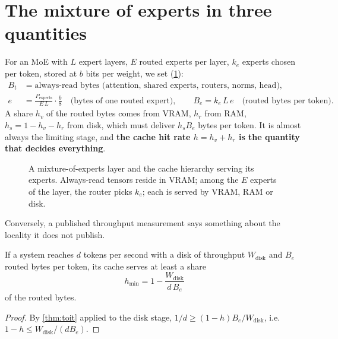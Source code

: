 \section{The mixture of experts in three quantities}\label{sec:moe-grandeurs}

For an MoE with $L$ expert layers, $E$ routed experts per layer, $k_e$ experts chosen per token, stored at $b$ bits per weight, we set (\cref{fig:moe}):
\begin{align}
B_t &= \text{always-read bytes (attention, shared experts, routers, norms, head)}, \nonumber\\
e &= \frac{P_{\text{experts}}}{E\, L} \cdot \frac{b}{8} \quad \text{(bytes of one routed expert)}, \qquad
B_e = k_e\, L\, e \quad \text{(routed bytes per token)}. \label{eq:moe-grandeurs}
\end{align}
A share $h_v$ of the routed bytes comes from VRAM, $h_r$ from RAM, $h_s = 1 - h_v - h_r$ from disk, which must deliver $h_s B_e$ bytes per token. It is almost always the limiting stage, and \textbf{the cache hit rate $h = h_v + h_r$ is the quantity that decides everything}.

\begin{figure}[ht]
\centering
\SchemaMoE
\caption[A mixture-of-experts layer and its cache hierarchy]{A mixture-of-experts layer and the cache hierarchy serving its experts. Always-read tensors reside in VRAM; among the $E$ experts of the layer, the router picks $k_e$; each is served by VRAM, RAM or disk.}
\label{fig:moe}
\end{figure}

Conversely, a published throughput measurement says something about the locality it does not publish.

\begin{lemme}\label{lem:succes-implique}
If a system reaches $d$ tokens per second with a disk of throughput $W_{\mathrm{disk}}$ and $B_e$ routed bytes per token, its cache serves at least a share
\begin{equation}\label{eq:succes-implique}
h_{\min} = 1 - \frac{W_{\mathrm{disk}}}{d\, B_e}
\end{equation}
of the routed bytes.
\end{lemme}

\begin{proof}
By \cref{thm:toit} applied to the disk stage, $1/d \ge (1-h) B_e / W_{\mathrm{disk}}$, i.e.\ $1 - h \le W_{\mathrm{disk}}/(d B_e)$.
\end{proof}

